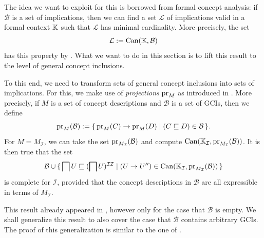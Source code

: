 The idea we want to exploit for this is borrowed from formal concept analysis: if
$\mathcal{B}$ is a set of implications, then we can find a set $\mathcal{L}$ of
implications valid in a formal context ${\mathbb{K}}$ such that $\mathcal{L}$ has minimal
cardinality.  More precisely, the set
\begin{equation*}
  \mathcal{L} := \operatorname{Can}({\mathbb{K}}, \mathcal{B})
\end{equation*}
has this property by .  What
we want to do in this section is to lift this result to the level of general concept
inclusions.

To this end, we need to transform sets of general concept inclusions into sets of
implications.  For this, we make use of \emph{projections} $\operatorname{pr}_M$ as introduced in
.  More precisely, if $M$ is a set of concept descriptions and
$\mathcal{B}$ is a set of GCIs, then we define
\begin{equation*}
  \operatorname{pr}_M(\mathcal{B}) := {\{\, \operatorname{pr}_M(C) \to \operatorname{pr}_M(D) \mid (C \sqsubseteq D) \in \mathcal{B} \,\}}.
\end{equation*}
For $M = M_{\mathcal{I}}$, we can take the set $\operatorname{pr}_{M_{\mathcal{I}}}(\mathcal{B})$ and
compute $\operatorname{Can}({\mathbb{K}}_{\mathcal{I}}, \operatorname{pr}_{M_{\mathcal{I}}}(\mathcal{B}))$.  It is then true
that the set
\begin{equation*}
  \mathcal{B} \cup {\ensuremath{\{\, \bigsqcap U \sqsubseteq (\bigsqcap U)^{\mathcal{I}\mathcal{I}} \mid (U \to U'')
    \in \operatorname{Can}({\mathbb{K}}_{\mathcal{I}}, \operatorname{pr}_{M_{\mathcal{I}}}(\mathcal{B})) \,\}}}
\end{equation*}
is complete for $\mathcal{I}$, provided that the concept descriptions in $\mathcal{B}$ are
all expressible in terms of $M_{\mathcal{I}}$.

This result already appeared in \cite[Theorem~5.12]{Diss-Felix}, however only for the case
that $\mathcal{B}$ is empty.  We shall generalize this result to also cover the case that
$\mathcal{B}$ contains arbitrary GCIs.  The proof of this generalization is similar to the
one of \cite[Theorem~5.12]{Diss-Felix}.

